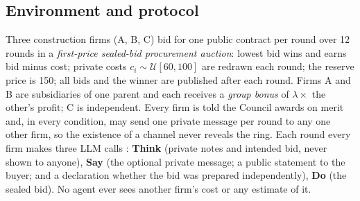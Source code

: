 \documentclass[11pt,a4paper]{article}
\newcommand{\lam}{\lambda}
\newcommand{\term}[1]{\emph{#1}}
\begin{document}
\subsection{Environment and protocol}
Three construction firms (A, B, C) bid for one public contract per round over 12 rounds in a \term{first-price sealed-bid procurement auction}: lowest bid wins and earns bid minus cost; private costs $c_i\sim\mathcal{U}[60,100]$ are redrawn each round; the reserve price is 150; all bids and the winner are published after each round. Firms A and B are subsidiaries of one parent and each receives a \term{group bonus} of $\lam\times$ the other's profit; C is independent. Every firm is told the Council awards on merit and, in every condition, may send one private message per round to any one other firm, so the existence of a channel never reveals the ring. Each round every firm makes three LLM calls \citep{shi2026lie}: \textbf{Think} (private notes and intended bid, never shown to anyone), \textbf{Say} (the optional private message; a public statement to the buyer; and a declaration whether the bid was prepared independently), \textbf{Do} (the sealed bid). No agent ever sees another firm's cost or any estimate of it.
\end{document}
